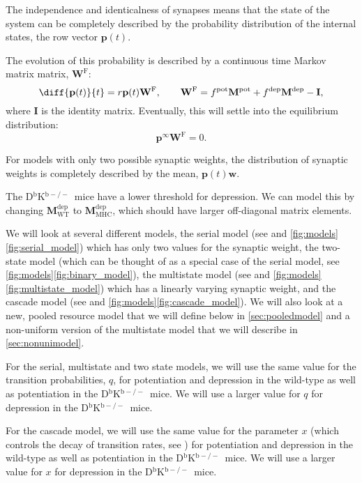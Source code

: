 \documentclass[12pt]{article}
\newcommand{\I}{\mathbf{I}}
\newcommand{\pr}{\mathbf{p}}
\newcommand{\eq}{\pr^\infty}
\newcommand{\w}{\mathbf{w}}
\newcommand{\W}{\mathbf{W}}
\newcommand{\frg}{\W^\mathrm{F}}
\newcommand{\M}{\mathbf{M}}
\newcommand{\pot}{^{\text{pot}}}
\newcommand{\dep}{^{\text{dep}}}
\newcommand{\wt}{_{\text{WT}}}
\newcommand{\KO}{D$^\mathrm{b}$K$^{\mathrm{b}-/-}$}
\newcommand{\ko}{_{\text{MHC}}}
\begin{document}
The independence and identicalness of synapses means that the state of the system can be completely described by the probability distribution of the internal states, the row vector $\pr(t)$.

The evolution of this probability is described by a continuous time Markov matrix matrix, $\frg$:
%
\begin{equation}\label{eq:evolve}
  \diff{\pr(t)}{t} = r\pr(t)\frg,
  \qquad
  \frg = f\pot\M\pot+f\dep\M\dep-\I,
\end{equation}
%
where $\I$ is the identity matrix.
Eventually, this will settle into the equilibrium distribution:
%
\begin{equation}\label{eq:eqprob}
  \eq\frg=0.
\end{equation}
%

For models with only two possible synaptic weights, the distribution of synaptic weights is completely described by the mean, $\pr(t)\w$.


The \KO\ mice have a lower threshold for depression.
We can model this by changing $\M\dep\wt$ to $\M\dep\ko$, which should have larger off-diagonal matrix elements.

We will look at several different models,
the serial model (see \cite{Leibold2008serial} and \autoref{fig:models}\ref{fig:serial_model}) which has only two values for the synaptic weight,
the two-state model (which can be thought of as a special case of the serial model, see \autoref{fig:models}\ref{fig:binary_model}),
the multistate model (see \cite{amit1994learning,Fusi2007multistate} and \autoref{fig:models}\ref{fig:multistate_model}) which has a linearly varying synaptic weight,
and the cascade model (see \cite{Fusi2005cascade} and \autoref{fig:models}\ref{fig:cascade_model}).
We will also look at a new, pooled resource model that we will define below in \autoref{sec:pooledmodel} and a non-uniform version of the multistate model that we will describe in \autoref{sec:nonunimodel}.

For the serial, multistate and two state models, we will use the same value for the transition probabilities, $q$, for potentiation and depression in the wild-type as well as potentiation in the \KO\ mice.
We will use a larger value for $q$ for depression in the \KO\ mice.

For the cascade model, we will use the same value for the parameter $x$ (which controls the decay of transition rates, see \cite{Fusi2005cascade}) for potentiation and depression in the wild-type as well as potentiation in the \KO\ mice.
We will use a larger value for $x$ for depression in the \KO\ mice.
\end{document}
